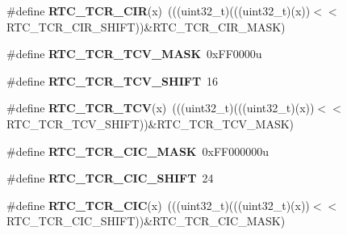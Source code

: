 \begin{DoxyCompactItemize}
\item 
\#define {\bfseries R\+T\+C\+\_\+\+T\+C\+R\+\_\+\+C\+IR}(x)~(((uint32\+\_\+t)(((uint32\+\_\+t)(x))$<$$<$R\+T\+C\+\_\+\+T\+C\+R\+\_\+\+C\+I\+R\+\_\+\+S\+H\+I\+FT))\&R\+T\+C\+\_\+\+T\+C\+R\+\_\+\+C\+I\+R\+\_\+\+M\+A\+SK)\hypertarget{group__RTC__Register__Masks_ga2425cc5a6f775938d0c0aa5448b96b05}{}\label{group__RTC__Register__Masks_ga2425cc5a6f775938d0c0aa5448b96b05}

\item 
\#define {\bfseries R\+T\+C\+\_\+\+T\+C\+R\+\_\+\+T\+C\+V\+\_\+\+M\+A\+SK}~0x\+F\+F0000u\hypertarget{group__RTC__Register__Masks_ga920f92da02ac0a6ae0931645600e2405}{}\label{group__RTC__Register__Masks_ga920f92da02ac0a6ae0931645600e2405}

\item 
\#define {\bfseries R\+T\+C\+\_\+\+T\+C\+R\+\_\+\+T\+C\+V\+\_\+\+S\+H\+I\+FT}~16\hypertarget{group__RTC__Register__Masks_ga6bcbafe57cdb430da5ee6902e0bcb224}{}\label{group__RTC__Register__Masks_ga6bcbafe57cdb430da5ee6902e0bcb224}

\item 
\#define {\bfseries R\+T\+C\+\_\+\+T\+C\+R\+\_\+\+T\+CV}(x)~(((uint32\+\_\+t)(((uint32\+\_\+t)(x))$<$$<$R\+T\+C\+\_\+\+T\+C\+R\+\_\+\+T\+C\+V\+\_\+\+S\+H\+I\+FT))\&R\+T\+C\+\_\+\+T\+C\+R\+\_\+\+T\+C\+V\+\_\+\+M\+A\+SK)\hypertarget{group__RTC__Register__Masks_gaa8994c74539b06641e723be00af76459}{}\label{group__RTC__Register__Masks_gaa8994c74539b06641e723be00af76459}

\item 
\#define {\bfseries R\+T\+C\+\_\+\+T\+C\+R\+\_\+\+C\+I\+C\+\_\+\+M\+A\+SK}~0x\+F\+F000000u\hypertarget{group__RTC__Register__Masks_ga788e49f72c48b3c98794b49e27337c64}{}\label{group__RTC__Register__Masks_ga788e49f72c48b3c98794b49e27337c64}

\item 
\#define {\bfseries R\+T\+C\+\_\+\+T\+C\+R\+\_\+\+C\+I\+C\+\_\+\+S\+H\+I\+FT}~24\hypertarget{group__RTC__Register__Masks_ga84c801695fa1e344e7b2c8e6568cb7c8}{}\label{group__RTC__Register__Masks_ga84c801695fa1e344e7b2c8e6568cb7c8}

\item 
\#define {\bfseries R\+T\+C\+\_\+\+T\+C\+R\+\_\+\+C\+IC}(x)~(((uint32\+\_\+t)(((uint32\+\_\+t)(x))$<$$<$R\+T\+C\+\_\+\+T\+C\+R\+\_\+\+C\+I\+C\+\_\+\+S\+H\+I\+FT))\&R\+T\+C\+\_\+\+T\+C\+R\+\_\+\+C\+I\+C\+\_\+\+M\+A\+SK)\hypertarget{group__RTC__Register__Masks_ga650d1b34ad6d46090befda0296b4fe3f}{}\label{group__RTC__Register__Masks_ga650d1b34ad6d46090befda0296b4fe3f}


\end{DoxyCompactItemize}
